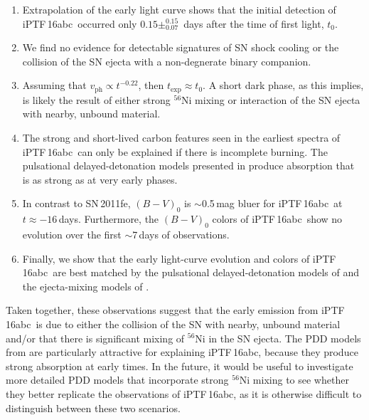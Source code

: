 \documentclass[twocolumn]{aastex61}
\newcommand{\abc}{iPTF\,16abc}
\begin{document}
\begin{enumerate} 
    
    \item Extrapolation of the early light curve shows that the initial
    detection of \abc\ occurred only $0.15\pm_{0.07}^{0.15}$~days after the
    time of first light, $t_0$.

    \item We find no evidence for detectable signatures of SN shock cooling
    or the collision of the SN ejecta with a non-degnerate binary companion.

    \item Assuming that $v_\mathrm{ph} \propto t^{-0.22}$, then
    $t_\mathrm{exp} \approx t_0$. A short dark phase, as this implies, is
    likely the result of either strong $^{56}$Ni mixing or interaction of
    the SN ejecta with nearby, unbound material.

    \item The strong and short-lived carbon features seen in the earliest
    spectra of \abc\ can only be explained if there is incomplete burning.
    The pulsational delayed-detonation models presented in
    \citet{2014MNRAS.441..532D} produce  absorption that is as
    strong as  at very early phases.

    \item In contrast to SN\,2011fe, $(B - V)_0$ is $\sim$0.5\,mag bluer for
    \abc\ at $t \approx -16$\,days. Furthermore, the $(B - V)_0$ colors of
    \abc\ show no evolution over the first $\sim$7\,days of observations.

    \item Finally, we show that the early light-curve evolution and colors
    of \abc\ are best matched by the pulsational delayed-detonation models
    of \citet{2014MNRAS.441..532D} and the ejecta-mixing models of
    \citet{2016ApJ...826...96P}.
 
\end{enumerate}
%
Taken together, these observations suggest that the early emission from
\abc\ is due to either the collision of the SN with nearby, unbound material
and/or that there is significant mixing of $^{56}$Ni in the SN ejecta. The
PDD models from \citet{2014MNRAS.441..532D} are particularly attractive for
explaining \abc, because they produce strong  absorption at early
times. In the future, it would be useful to investigate more detailed PDD
models that incorporate strong $^{56}$Ni mixing to see whether they better
replicate the observations of \abc, as it is otherwise difficult to
distinguish between these two scenarios.
\end{document}
